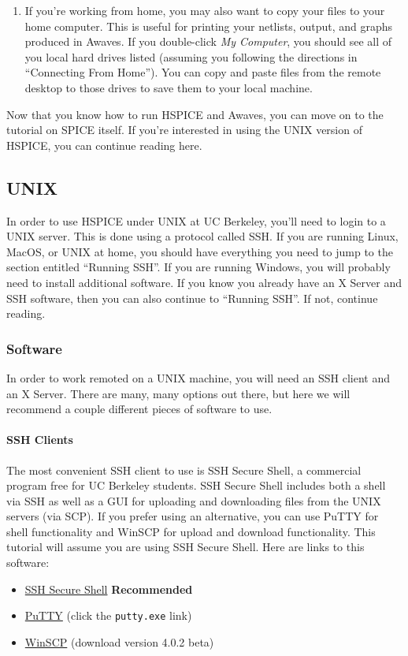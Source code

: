 \documentclass{article}
\begin{document}
\begin{enumerate}
\item If you're working from home, you may also want to copy your files to your home computer. This is useful for printing your netlists, output, and graphs produced in Awaves. If you double-click \textit{My Computer}, you should see all of you local hard drives listed (assuming you following the directions in ``Connecting From Home''). You can copy and paste files from the remote desktop to those drives to save them to your local machine.
\end{enumerate}

Now that you know how to run HSPICE and Awaves, you can move on to the tutorial on SPICE itself. If you're interested in using the UNIX version of HSPICE, you can continue reading here.

\subsection{UNIX}

In order to use HSPICE under UNIX at UC Berkeley, you'll need to login to a UNIX server. This is done using a protocol called SSH. If you are running Linux, MacOS, or UNIX at home, you should have everything you need to jump to the section entitled ``Running SSH''. If you are running Windows, you will probably need to install additional software. If you know you already have an X Server and SSH software, then you can also continue to ``Running SSH''. If not, continue reading.

\subsubsection{Software}

In order to work remoted on a UNIX machine, you will need an SSH client and an X Server. There are many, many options out there, but here we will recommend a couple different pieces of software to use.

\paragraph{SSH Clients} The most convenient SSH client to use is SSH Secure Shell, a commercial program free for UC Berkeley students. SSH Secure Shell includes both a shell via SSH as well as a GUI for uploading and downloading files from the UNIX servers (via SCP). If you prefer using an alternative, you can use PuTTY for shell functionality and WinSCP for upload and download functionality. This tutorial will assume you are using SSH Secure Shell. Here are links to this software:
\begin{itemize}
  \item \href{http://software-central.berkeley.edu/all/ssh+secure+shell}{SSH Secure Shell} \textbf{Recommended}
  \item \href{http://www.chiark.greenend.org.uk/~sgtatham/putty/download.html}{PuTTY} (click the \verb|putty.exe| link)
  \item \href{http://winscp.net/eng/download.php}{WinSCP} (download version 4.0.2 beta)
\end{itemize}
\end{document}
